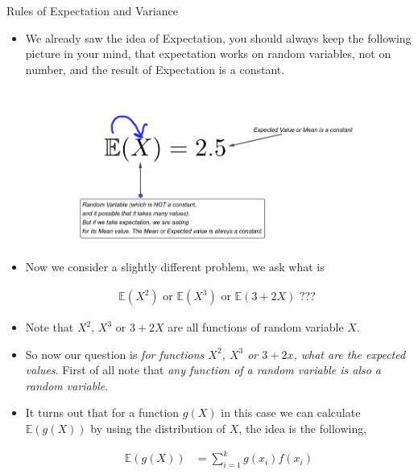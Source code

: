 \documentclass[8pt, usepdftitle = false]{beamer}
\begin{document}
\begin{frame}[allowframebreaks]{Rules of Expectation and Variance}

\begin{itemize}


\item We already saw the idea of Expectation, you should always keep the following picture in your mind, that expectation works on random variables, not on number, and the result of Expectation is a constant.


\begin{figure}
\includegraphics[scale = .5]{Images/RV_1.png}
\end{figure}


\framebreak

\item Now we consider a slightly different problem, we ask what is 

{\huge{
\vspace*{-.5cm}
\begin{align*}
\mathbb{E}(X^2) \text{ or } \mathbb{E}(X^3)  \text{ or } \mathbb{E}(3 + 2X) \text{ ??? }
\end{align*}
}}

\item Note that $X^2$, $X^3$ or $3 + 2X$ are all functions of random variable $X$. 

\item So now our question is \emph{for functions $X^2$, $X^3$ or $3 + 2x$, what are the expected values}. First of all note that \emph{any function of a random variable is also a random variable}. 

\item It turns out that for a function $g(X)$ in this case we can calculate $\mathbb{E}(g(X))$ by using the distribution of $X$, the idea is the following,

\begin{align*}
\mathbb{E}(g(X)) &= \sum_{i = 1}^{k} g(x_i) f(x_i) 
\end{align*}


\end{itemize}
\end{frame}
\end{document}
